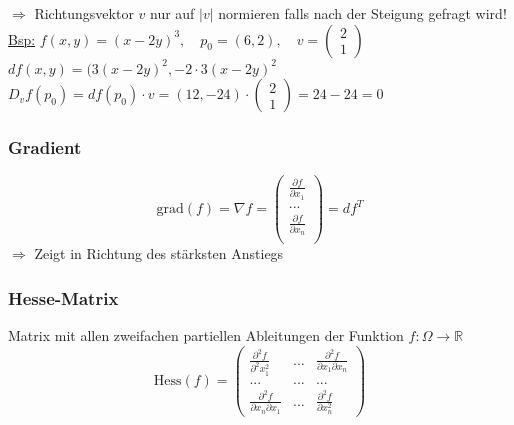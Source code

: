 \documentclass[6pt]{article}
\begin{document}
\begin{multicols*}{3}
	$\Rightarrow$ Richtungsvektor $v$ nur auf $|v|$ normieren falls nach der Steigung gefragt wird! \vspace{2mm}\\
	
	\underline{Bsp:}		\quad $f(x,y) = (x-2y)^3, \quad p_0=(6,2), \quad v= \begin{pmatrix} 2 \\  1 \end{pmatrix}$ \vspace{1mm}\\
	$df(x,y) = (3(x-2y)^2 , -2 \cdot 3 (x-2y)^2$ \vspace{1mm}\\
	$D_vf(p_0) = df(p_0) \cdot v = (12 , -24) \cdot \begin{pmatrix} 2 \\  1 \end{pmatrix} = 24 - 24 = 0 $ 
	
	
	
	\columnbreak
	\subsubsection*{Gradient}
		\begin{equation*}
				\text{grad}(f)=\nabla f=
				\begin{pmatrix}
						\frac{\partial f}{\partial x_1}\\
						...\\
						\frac{\partial f}{\partial x_n}\\
				\end{pmatrix}
				 = df^T
		\end{equation*}
		$\Rightarrow$ Zeigt in Richtung des st{\"a}rksten Anstiegs
	
	
	\subsubsection*{Hesse-Matrix}
		Matrix mit allen zweifachen partiellen Ableitungen der Funktion $f: \Omega \rightarrow \mathbb{R}$ 
		\begin{equation*}
			\text{Hess}(f)=
				\begin{pmatrix}
					\frac{\partial^2 f}{\partial^2x_1^2} & ... & \frac{\partial^2 f}{\partial x_1 \partial x_n}\\
					...&...&...\\
					\frac{\partial^2 f}{\partial x_n \partial x_1} & ... & \frac{\partial^2 f}{\partial x_n^2}
				\end{pmatrix}
		\end{equation*}
		

\end{multicols*}
\end{document}
